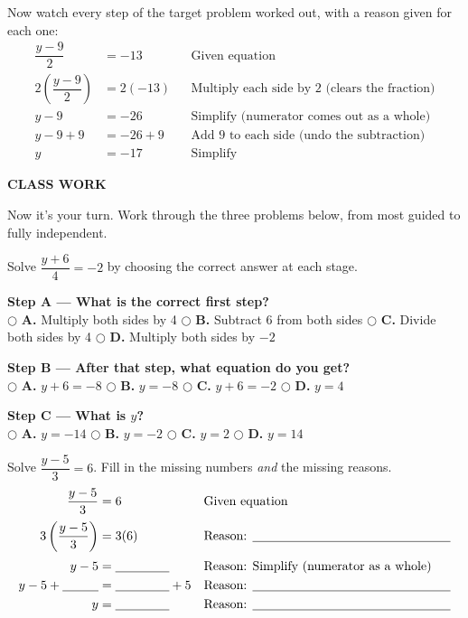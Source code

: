\documentclass[11pt]{article}
\newcommand{\choice}[2]{\hspace{2mm}$\bigcirc$\; \textbf{#1.} #2}
\newcommand{\banner}[2]{%
  \begin{center}
  \colorbox{#1}{\parbox{0.97\linewidth}{\centering\color{white}\bfseries\Large\vspace{1.2mm} #2 \vspace{1.2mm}}}
  \end{center}%
  \vspace{2mm}
}
\begin{document}
\begin{applybox}
Now watch every step of the target problem worked out, with a reason given for each one:
\begin{align*}
\dfrac{y-9}{2} &= -13 &&\text{Given equation}\\[2pt]
2\left(\dfrac{y-9}{2}\right) &= 2(-13) &&\text{Multiply each side by 2 (clears the fraction)}\\[2pt]
y - 9 &= -26 &&\text{Simplify (numerator comes out as a whole)}\\
y - 9 + 9 &= -26 + 9 &&\text{Add 9 to each side (undo the subtraction)}\\
y &= -17 &&\text{Simplify}
\end{align*}
\end{applybox}

\banner{brandred}{CLASS WORK}
Now it's your turn. Work through the three problems below, from most guided to fully independent.

\begin{mcbox}
Solve $\dfrac{y+6}{4} = -2$ by choosing the correct answer at each stage.

\textbf{Step A --- What is the correct first step?}\\
\choice{A}{Multiply both sides by 4}\quad
\choice{B}{Subtract 6 from both sides}\quad
\choice{C}{Divide both sides by 4}\quad
\choice{D}{Multiply both sides by $-2$}

\vspace{2mm}
\textbf{Step B --- After that step, what equation do you get?}\\
\choice{A}{$y + 6 = -8$}\quad
\choice{B}{$y = -8$}\quad
\choice{C}{$y + 6 = -2$}\quad
\choice{D}{$y = 4$}

\vspace{2mm}
\textbf{Step C --- What is $y$?}\\
\choice{A}{$y = -14$}\quad
\choice{B}{$y = -2$}\quad
\choice{C}{$y = 2$}\quad
\choice{D}{$y = 14$}
\end{mcbox}

\begin{fillbox}
Solve $\dfrac{y-5}{3} = 6$. Fill in the missing numbers \emph{and} the missing reasons.
\begin{align*}
\dfrac{y-5}{3} &= 6 &&\text{Given equation}\\[2pt]
3\left(\dfrac{y-5}{3}\right) &= 3(6) &&\text{Reason: }\underline{\hspace{5.5cm}}\\[2pt]
y - 5 &= \underline{\hspace{1.5cm}} &&\text{Reason: Simplify (numerator as a whole)}\\
y - 5 + \underline{\hspace{1cm}} &= \underline{\hspace{1.5cm}} + 5 &&\text{Reason: }\underline{\hspace{5.5cm}}\\
y &= \underline{\hspace{1.5cm}} &&\text{Reason: }\underline{\hspace{5.5cm}}
\end{align*}
\end{fillbox}
\end{document}
